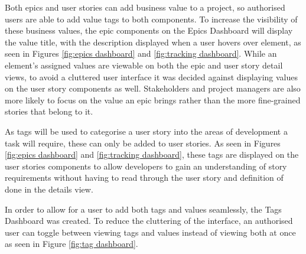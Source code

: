 \documentclass[l4proj.tex]{subfiles}
\begin{document}
Both epics and user stories can add business value to a project, so authorised users are able to add value tags to both components. To increase the visibility of these business values, the epic components on the Epics Dashboard will display the value title, with the description displayed when a user hovers over element, as seen in Figures \ref{fig:epics dashboard} and \ref{fig:tracking dashboard}. While an element's assigned values are viewable on both the epic and user story detail views, to avoid a cluttered user interface it was decided against displaying values on the user story components as well. Stakeholders and project managers are also more likely to focus on the value an epic brings rather than the more fine-grained stories that belong to it. 

As tags will be used to categorise a user story into the areas of development a task will require, these can only be added to user stories. As seen in Figures \ref{fig:epics dashboard} and \ref{fig:tracking dashboard}, these tags are displayed on the user stories components to allow developers to gain an understanding of story requirements without having to read through the user story and definition of done in the details view. 

In order to allow for a user to add both tags and values seamlessly, the Tags Dashboard was created. To reduce the cluttering of the interface, an authorised user can toggle between viewing tags and values instead of viewing both at once as seen in Figure \ref{fig:tag dashboard}.
\end{document}
